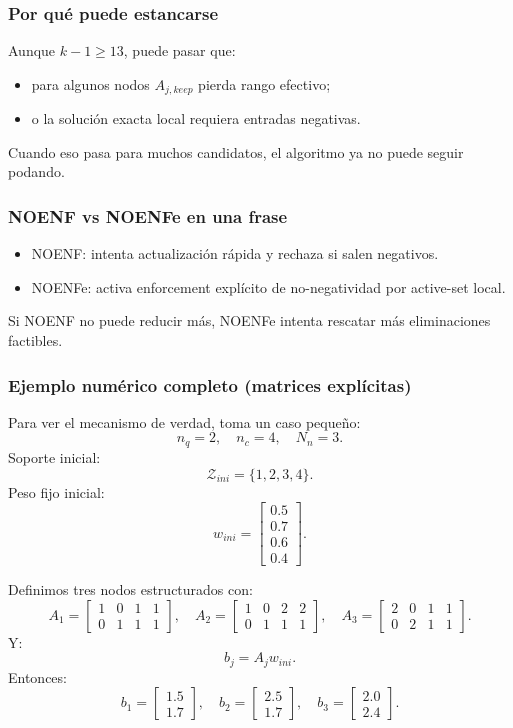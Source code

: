 \documentclass[11pt,a4paper]{article}
\begin{document}
\subsubsection*{Por qué puede estancarse}
Aunque $k-1\ge13$, puede pasar que:
\begin{itemize}[leftmargin=1.5em]
\item para algunos nodos $A_{j,keep}$ pierda rango efectivo;
\item o la solución exacta local requiera entradas negativas.
\end{itemize}
Cuando eso pasa para muchos candidatos, el algoritmo ya no puede seguir podando.

\subsubsection*{NOENF vs NOENFe en una frase}
\begin{itemize}[leftmargin=1.5em]
\item NOENF: intenta actualización rápida y rechaza si salen negativos.
\item NOENFe: activa enforcement explícito de no-negatividad por active-set local.
\end{itemize}

Si NOENF no puede reducir más, NOENFe intenta rescatar más eliminaciones factibles.

\subsubsection*{Ejemplo numérico completo (matrices explícitas)}
Para ver el mecanismo de verdad, toma un caso pequeño:
\[
n_q=2,\quad n_c=4,\quad N_n=3.
\]
Soporte inicial:
\[
\mathcal Z_{ini}=\{1,2,3,4\}.
\]
Peso fijo inicial:
\[
w_{ini}=
\begin{bmatrix}
0.5\\0.7\\0.6\\0.4
\end{bmatrix}.
\]

Definimos tres nodos estructurados con:
\[
A_1=
\begin{bmatrix}
1&0&1&1\\
0&1&1&1
\end{bmatrix},\quad
A_2=
\begin{bmatrix}
1&0&2&2\\
0&1&1&1
\end{bmatrix},\quad
A_3=
\begin{bmatrix}
2&0&1&1\\
0&2&1&1
\end{bmatrix}.
\]
Y:
\[
b_j=A_jw_{ini}.
\]
Entonces:
\[
b_1=
\begin{bmatrix}
1.5\\1.7
\end{bmatrix},\quad
b_2=
\begin{bmatrix}
2.5\\1.7
\end{bmatrix},\quad
b_3=
\begin{bmatrix}
2.0\\2.4
\end{bmatrix}.
\]
\end{document}
